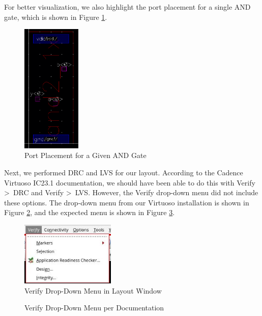 \documentclass{article}
\begin{document}
	\noindent For better visualization, we also highlight the port placement for a single AND gate, which is shown in Figure \ref{fig::and2_1x_8_single_gate_ports}.
	
	\begin{figure}[H]
		\centerline{\includegraphics[width=0.25\textwidth]{and2_1x_8_single_gate_ports.png}}
		\caption{Port Placement for a Given AND Gate}
		\label{fig::and2_1x_8_single_gate_ports}
	\end{figure}
	
	\noindent Next, we performed DRC and LVS for our layout. According to the Cadence Virtuoso IC23.1 documentation, we should have been able to do this with Verify \textgreater\ DRC and Verify \textgreater\ LVS. However, the Verify drop-down menu did not include these options. The drop-down menu from our Virtuoso installation is shown in Figure \ref{fig::verify_dropdown_menu}, and the expected menu is shown in Figure \ref{fig::verify_dropdown_menu_doc}.
	
	\begin{figure}[H]
		\centerline{\includegraphics[width=0.4\textwidth]{verify_dropdown_menu.png}}
		\caption{Verify Drop-Down Menu in Layout Window}
		\label{fig::verify_dropdown_menu}
	\end{figure}
	
	\begin{figure}[H]
		\centerline{}
		\caption{Verify Drop-Down Menu per Documentation}
		\label{fig::verify_dropdown_menu_doc}
	\end{figure}
	
\end{document}
